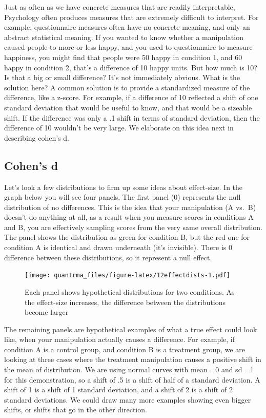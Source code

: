 \documentclass[
]{book}
\begin{document}
Just as often as we have concrete measures that are readily interpretable, Psychology often produces measures that are extremely difficult to interpret. For example, questionnaire measures often have no concrete meaning, and only an abstract statistical meaning. If you wanted to know whether a manipulation caused people to more or less happy, and you used to questionnaire to measure happiness, you might find that people were 50 happy in condition 1, and 60 happy in condition 2, that's a difference of 10 happy units. But how much is 10? Is that a big or small difference? It's not immediately obvious. What is the solution here? A common solution is to provide a standardized measure of the difference, like a z-score. For example, if a difference of 10 reflected a shift of one standard deviation that would be useful to know, and that would be a sizeable shift. If the difference was only a .1 shift in terms of standard deviation, then the difference of 10 wouldn't be very large. We elaborate on this idea next in describing cohen's d.

\hypertarget{cohens-d}{%
\subsection{Cohen's d}\label{cohens-d}}

Let's look a few distributions to firm up some ideas about effect-size. In the graph below you will see four panels. The first panel (0) represents the null distribution of no differences. This is the idea that your manipulation (A vs.~B) doesn't do anything at all, as a result when you measure scores in conditions A and B, you are effectively sampling scores from the very same overall distribution. The panel shows the distribution as green for condition B, but the red one for condition A is identical and drawn underneath (it's invisible). There is 0 difference between these distributions, so it represent a null effect.

\begin{figure}
\centering
\texttt{[image: quantrma\_files/figure-latex/12effectdists-1.pdf]}
\caption{\label{fig:12effectdists}Each panel shows hypothetical distributions for two conditions. As the effect-size increases, the difference between the distributions become larger}
\end{figure}

The remaining panels are hypothetical examples of what a true effect could look like, when your manipulation actually causes a difference. For example, if condition A is a control group, and condition B is a treatment group, we are looking at three cases where the treatment manipulation causes a positive shift in the mean of distribution. We are using normal curves with mean =0 and sd =1 for this demonstration, so a shift of .5 is a shift of half of a standard deviation. A shift of 1 is a shift of 1 standard deviation, and a shift of 2 is a shift of 2 standard deviations. We could draw many more examples showing even bigger shifts, or shifts that go in the other direction.
\end{document}
